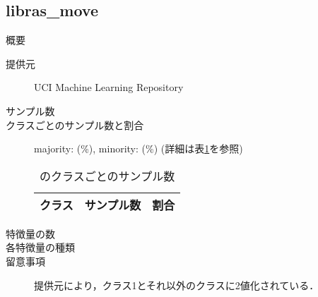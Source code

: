 \subsection{libras\_move}
\begin{description}
    \item[概要] \cite{}
    \item[提供元] UCI Machine Learning Repository
    \item[サンプル数] 
    \item[クラスごとのサンプル数と割合] majority:  (\%), minority:  (\%) (詳細は表\ref{tab:}を参照)

        \begin{table}[htbp]
            \centering
            \caption{のクラスごとのサンプル数}
            \label{tab:}
            \begin{tabular}{lrc} \hline
                \multicolumn{1}{c}{クラス}&
                \multicolumn{1}{c}{サンプル数}&
                \multicolumn{1}{c}{割合}\\
                \hline
                \hline

                \hline
            \end{tabular}
        \end{table}

    \item[特徴量の数] 
    \item[各特徴量の種類] \mbox{}
        
    \item[留意事項] 提供元により，クラス1とそれ以外のクラスに2値化されている．
\end{description}

